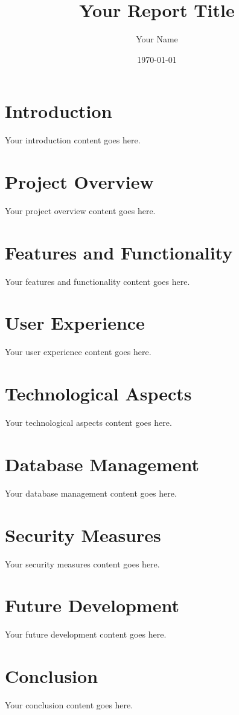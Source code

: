 \documentclass{article}
\title{\textbf{Your Report Title}}
\author{Your Name}
\date{\today}
\begin{document}
\maketitle

\section*{Introduction}
Your introduction content goes here.

\section{Project Overview}
Your project overview content goes here.

\section{Features and Functionality}
Your features and functionality content goes here.

\section{User Experience}
Your user experience content goes here.

\section{Technological Aspects}
Your technological aspects content goes here.

\section{Database Management}
Your database management content goes here.

\section{Security Measures}
Your security measures content goes here.

\section{Future Development}
Your future development content goes here.

\section*{Conclusion}
Your conclusion content goes here.

\end{document}
